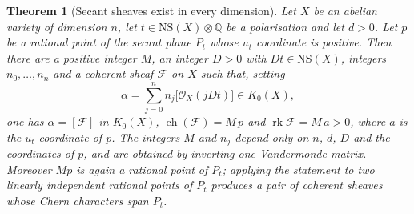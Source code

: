 \documentclass[11pt,reqno]{amsart}
\theoremstyle{plain}
\newtheorem{theorem}{Theorem}[section]
\theoremstyle{definition}
\theoremstyle{remark}
\newcommand{\QQ}{\mathbb{Q}}
\newcommand{\cF}{\mathcal{F}}
\newcommand{\cO}{\mathcal{O}}
\newcommand{\NS}{\mathrm{NS}}
\DeclareMathOperator{\ch}{ch}
\DeclareMathOperator{\rk}{rk}
\begin{document}
\begin{theorem}[Secant sheaves exist in every dimension]\label{thm:secantexists}
Let $X$ be an abelian variety of dimension $n$, let $t\in\NS(X)\otimes\QQ$ be a
polarisation and let $d>0$. Let $p$ be a rational point of the secant plane
$P_{t}$ whose $u_{t}$ coordinate is positive. Then there are a positive
integer $M$, an integer $D>0$ with $Dt\in\NS(X)$, integers $n_{0},\dots,n_{n}$
and a coherent sheaf $\cF$ on $X$ such that, setting
\begin{equation}\label{eq:lbwitness}
  \alpha=\sum_{j=0}^{n}n_{j}\bigl[\cO_{X}(jDt)\bigr]\in K_{0}(X),
\end{equation}
one has $\alpha=[\cF]$ in $K_{0}(X)$, $\ch(\cF)=M\,p$ and
$\rk\cF=M\,a>0$, where $a$ is the $u_{t}$ coordinate of $p$. The integers $M$
and $n_{j}$ depend only on $n$, $d$, $D$ and the coordinates of $p$, and are
obtained by inverting one Vandermonde matrix. Moreover $Mp$ is again a
rational point of $P_{t}$; applying the statement to two linearly independent
rational points of $P_{t}$ produces a pair of coherent sheaves whose Chern
characters span $P_{t}$.
\end{theorem}
\end{document}
